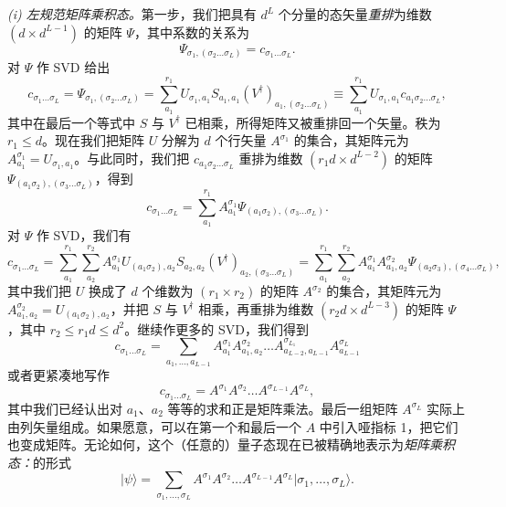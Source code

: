 \documentclass[a4paper,10pt,oneside,onecolumn,1p,times]{elsarticle}
\newcommand{\ket}[1]{\mbox{$| #1  \rangle$}}
\begin{document}
{\em (i) 左规范矩阵乘积态。}第一步，我们把具有 $d^L$ 个分量的态矢量{\em 重排}为维数 $(d \times d^{L-1})$ 的矩阵 $\Psi$，其中系数的关系为 
\begin{equation}
\Psi_{\sigma_1, (\sigma_2 \ldots \sigma_L)} = c_{\sigma_1 \ldots \sigma_L}  .
\end{equation}
对 $\Psi$ 作 SVD 给出
\begin{equation}
c_{\sigma_1 \ldots \sigma_L}  = \Psi_{\sigma_1, (\sigma_2 \ldots \sigma_L)} = \sum_{a_1}^{r_1} U_{\sigma_1,a_1} S_{a_1,a_1} (V^\dagger)_{a_1, (\sigma_2 \ldots \sigma_L)} \equiv \sum_{a_1}^{r_1}  U_{\sigma_1,a_1} c_{a_1\sigma_2\ldots\sigma_L} ,
\end{equation}
其中在最后一个等式中 $S$ 与 $V^\dagger$ 已相乘，所得矩阵又被重排回一个矢量。秩为 $r_1 \leq d$。现在我们把矩阵 $U$ 分解为 $d$ 个行矢量 $A^{\sigma_1}$ 的集合，其矩阵元为 $A^{\sigma_1}_{a_1}=U_{\sigma_1,a_1}$。与此同时，我们把 $c_{a_1\sigma_2\ldots\sigma_L}$ 重排为维数 $(r_1 d \times d^{L-2})$ 的矩阵 $\Psi_{(a_1\sigma_2),(\sigma_3 \ldots \sigma_L)}$，得到
\begin{equation}
c_{\sigma_1 \ldots \sigma_L}  = \sum_{a_1}^{r_1} A^{\sigma_1}_{a_1} \Psi_{(a_1\sigma_2), (\sigma_3 \ldots \sigma_L)} .
\end{equation}
对 $\Psi$ 作 SVD，我们有 
\begin{equation}
c_{\sigma_1 \ldots \sigma_L}  = \sum_{a_1}^{r_1} \sum_{a_2}^{r_2} A^{\sigma_1}_{a_1} U_{(a_1\sigma_2),a_2} S_{a_2,a_2} (V^\dagger)_{a_2, (\sigma_3 \ldots \sigma_L)} =  
\sum_{a_1}^{r_1} \sum_{a_2}^{r_2} A^{\sigma_1}_{a_1} A^{\sigma_2}_{a_1,a_2} \Psi_{(a_2\sigma_3), (\sigma_4 \ldots \sigma_L)} ,
\end{equation}
其中我们把 $U$ 换成了 $d$ 个维数为 $(r_1 \times r_2)$ 的矩阵 $A^{\sigma_2}$ 的集合，其矩阵元为 $A^{\sigma_2}_{a_1,a_2} = U_{(a_1\sigma_2),a_2}$，并把 $S$ 与 $V^\dagger$ 相乘，再重排为维数 $(r_2 d \times d ^{L-3})$ 的矩阵 $\Psi$，其中 $r_2 \leq r_1 d \leq d^2$。继续作更多的 SVD，我们得到
\begin{equation}
c_{\sigma_1 \ldots \sigma_L} = \sum_{a_1, \ldots, a_{L-1}} A^{\sigma_1}_{a_1} A^{\sigma_2}_{a_1,a_2} \ldots A^{\sigma_{L_1}}_{a_{L-2},a_{L-1}} A^{\sigma_{L}}_{a_{L-1}}
\end{equation}
或者更紧凑地写作
\begin{equation}
c_{\sigma_1 \ldots \sigma_L} = A^{\sigma_1} A^{\sigma_2} \ldots A^{\sigma_{L-1}} A^{\sigma_L} ,
\end{equation}
其中我们已经认出对 $a_1$、$a_2$ 等等的求和正是矩阵乘法。最后一组矩阵 $A^{\sigma_L}$ 实际上由列矢量组成。如果愿意，可以在第一个和最后一个 $A$ 中引入哑指标 1，把它们也变成矩阵。无论如何，这个（任意的）量子态现在已被精确地表示为{\em 矩阵乘积态：}的形式
\begin{equation}
\ket{\psi} = \sum_{\sigma_1,\ldots,\sigma_L} A^{\sigma_1} A^{\sigma_2} \ldots A^{\sigma_{L-1}} A^{\sigma_L} \ket{\sigma_1,\ldots,\sigma_L} .
\end{equation}
\end{document}
